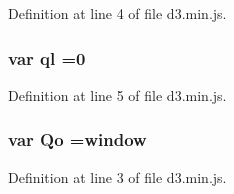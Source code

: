 Definition at line 4 of file d3.\+min.\+js.

\subsubsection[{ql}]{\setlength{\rightskip}{0pt plus 5cm}var ql =0}\label{d3_8min_8js_ac4605a5cc538cccbab783cee62795109}


Definition at line 5 of file d3.\+min.\+js.

\subsubsection[{Qo}]{\setlength{\rightskip}{0pt plus 5cm}var Qo ={\bf window}}\label{d3_8min_8js_aa962dd312b6398fb55113f6c2e6e0ec2}


Definition at line 3 of file d3.\+min.\+js.


